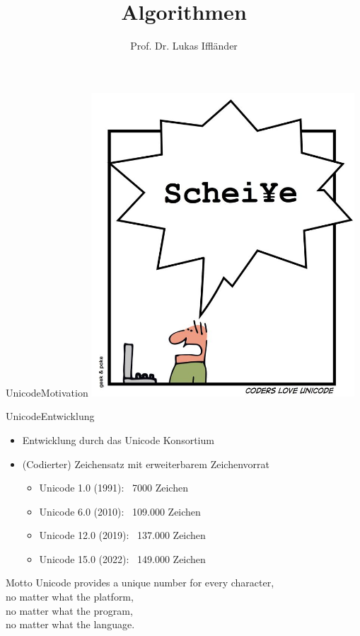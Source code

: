 \documentclass[xelatex,aspectratio=169]{beamer}
\title{Algorithmen}
\author{Prof. Dr. Lukas Iffländer}
\institute{HTW Dresden}
\date{}
\begin{document}
\begin{frame}{Unicode}{Motivation}
    \centering
    \includegraphics[height=.8\textheight]{img/codierung_scheisse.png}
\end{frame}

\begin{frame}{Unicode}{Entwicklung}
    \begin{itemize}
        \item Entwicklung durch das Unicode Konsortium
        \item (Codierter) Zeichensatz mit erweiterbarem Zeichenvorrat
              \begin{itemize}
                  \item Unicode 1.0 (1991): ~7000 Zeichen
                  \item Unicode 6.0 (2010): ~109.000 Zeichen
                  \item Unicode 12.0 (2019): ~137.000 Zeichen
                  \item Unicode 15.0 (2022): ~149.000 Zeichen
              \end{itemize}
    \end{itemize}
    \begin{block}{Motto}
        Unicode provides a unique number for every character, \\
        no matter what the platform, \\
        no matter what the program, \\
        no matter what the language.
    \end{block}
\end{frame}
\end{document}
